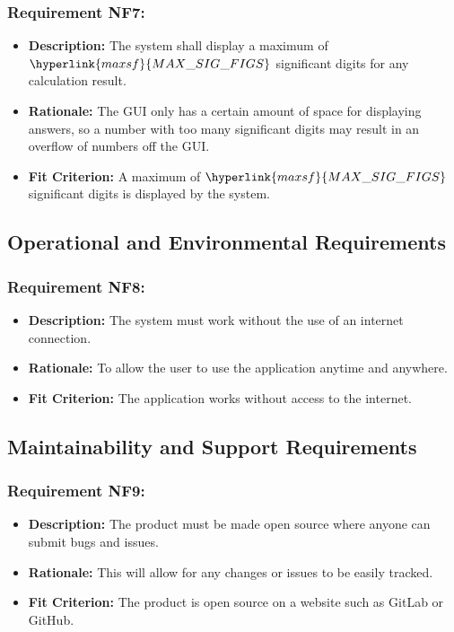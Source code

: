 \documentclass[12pt, titlepage]{article}
\begin{document}
\subsubsection*{Requirement NF7:}
\begin{itemize}
  \item \textbf{Description:} The system shall display a maximum of $\hyperlink{maxsf}{MAX\_SIG\_FIGS}$ significant digits for any calculation result.
  \item \textbf{Rationale:} The GUI only has a certain amount of space for displaying answers, so a number with too many significant digits may result in an overflow of numbers off the GUI.
  \item \textbf{Fit Criterion:} A maximum of $\hyperlink{maxsf}{MAX\_SIG\_FIGS}$ significant digits is displayed by the system.
\end{itemize}


\subsection{Operational and Environmental Requirements}
\subsubsection*{Requirement NF8:}
\begin{itemize}
  \item \textbf{Description:} The system must work without the use of an internet connection.
  \item \textbf{Rationale:} To allow the user to use the application anytime and anywhere.
  \item \textbf{Fit Criterion:} The application works without access to the internet.
\end{itemize}


\subsection{Maintainability and Support Requirements}
\subsubsection*{Requirement NF9:}
\begin{itemize}
  \item \textbf{Description:} The product must be made open source where anyone can submit bugs and issues.
  \item \textbf{Rationale:} This will allow for any changes or issues to be easily tracked.
  \item \textbf{Fit Criterion:} The product is open source on a website such as GitLab or GitHub.
\end{itemize}
\end{document}
